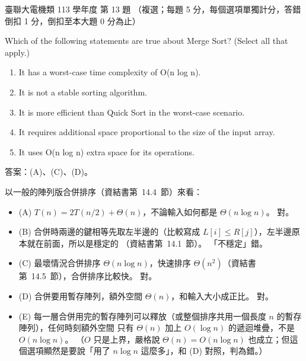 \begin{pastexam}[label={px:ust-113-ee-ds-13}]{臺聯大電機類 113 學年度 第 13 題}
（複選；每題 5 分，每個選項單獨計分，答錯倒扣 1 分，倒扣至本大題 0 分為止）

Which of the following statements are true about Merge Sort? (Select all that apply.)
\begin{enumerate}[label=(\Alph*)]
\item It has a worst-case time complexity of O(n log n).
\item It is not a stable sorting algorithm.
\item It is more efficient than Quick Sort in the worst-case scenario.
\item It requires additional space proportional to the size of the input array.
\item It uses O(n log n) extra space for its operations.
\end{enumerate}
\end{pastexam}

\begin{pastsoln}
答案：(A)、(C)、(D)。

以一般的陣列版合併排序（資結書第~14.4~節）來看：
\begin{itemize}
\item (A) $T(n) = 2T(n/2) + \Theta(n)$，不論輸入如何都是 $\Theta(n\log n)$。 對。
\item (B) 合併時兩邊的鍵相等先取左半邊的（比較寫成 $L[i] \le R[j]$），左半邊原本就在前面，所以是穩定的
（資結書第~14.1~節）。 「不穩定」錯。
\item (C) 最壞情況合併排序 $\Theta(n\log n)$，快速排序 $\Theta(n^2)$（資結書第~14.5~節），合併排序比較快。 對。
\item (D) 合併要用暫存陣列，額外空間 $\Theta(n)$，和輸入大小成正比。 對。
\item (E) 每一層合併用完的暫存陣列可以釋放（或整個排序共用一個長度 $n$ 的暫存陣列），任何時刻額外空間
只有 $\Theta(n)$ 加上 $O(\log n)$ 的遞迴堆疊，不是 $O(n\log n)$。 （$O$ 只是上界，嚴格說
$\Theta(n) = O(n\log n)$ 也成立；但這個選項顯然是要說「用了 $n\log n$ 這麼多」，和 (D) 對照，判為錯。）
\end{itemize}
\end{pastsoln}
